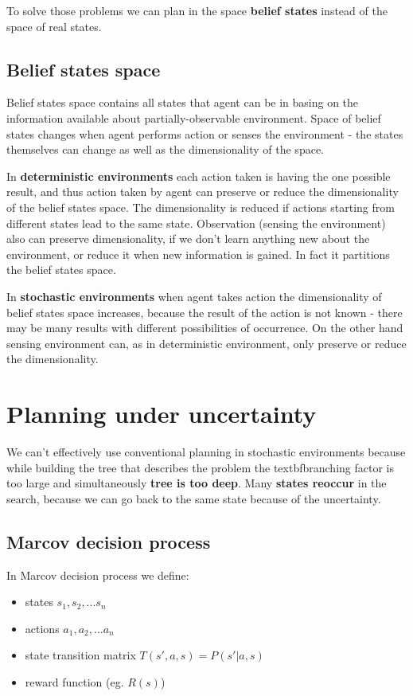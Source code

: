 \documentclass[a4paper,10pt]{article}
\begin{document}
To solve those problems we can plan in the space \textbf{belief states} instead of the space of real states.

\subsection{Belief states space}

Belief states space contains all states that agent can be in basing on the information available about partially-observable environment. Space of belief states changes when agent performs action or senses the environment - the states themselves can change as well as the dimensionality of the space.

In \textbf{deterministic environments} each action taken is having the one possible result, and thus action taken by agent can preserve or reduce the dimensionality of the belief states space. The dimensionality is reduced if actions starting from different states lead to the same state. Observation (sensing the environment) also can preserve dimensionality, if we don't learn anything new about the environment, or reduce it when new information is gained. In fact it partitions the belief states space.

In \textbf{stochastic environments} when agent takes action the dimensionality of belief states space increases, because the result of the action is not known - there may be many results with different possibilities of occurrence. On the other hand sensing environment can, as in deterministic environment, only preserve or reduce the dimensionality.

\section{Planning under uncertainty}

We can't effectively use conventional planning in stochastic environments because while building the tree that describes the problem the textbf{branching factor} is too large and simultaneously \textbf{tree is too deep}. Many \textbf{states reoccur} in the search, because we can go back to the same state because of the uncertainty.

\subsection{Marcov decision process}

In Marcov decision process we define:\begin{itemize}
\item states $s_1, s_2, ... s_n$
\item actions $a_1, a_2, ... a_n$
\item state transition matrix $T(s',a, s)=P(s'|a,s)$
\item reward function (eg. $R(s)$)
\end{itemize}
\end{document}
